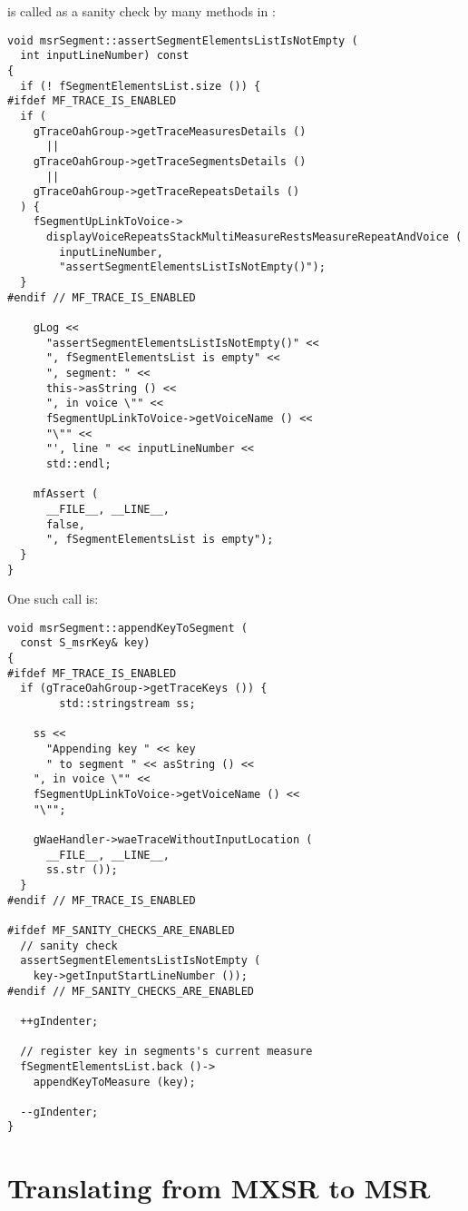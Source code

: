  is called as a sanity check by many methods in :
\begin{lstlisting}[language=CPlusPlus]
void msrSegment::assertSegmentElementsListIsNotEmpty (
  int inputLineNumber) const
{
  if (! fSegmentElementsList.size ()) {
#ifdef MF_TRACE_IS_ENABLED
  if (
    gTraceOahGroup->getTraceMeasuresDetails ()
      ||
    gTraceOahGroup->getTraceSegmentsDetails ()
      ||
    gTraceOahGroup->getTraceRepeatsDetails ()
  ) {
    fSegmentUpLinkToVoice->
      displayVoiceRepeatsStackMultiMeasureRestsMeasureRepeatAndVoice (
        inputLineNumber,
        "assertSegmentElementsListIsNotEmpty()");
  }
#endif // MF_TRACE_IS_ENABLED

    gLog <<
      "assertSegmentElementsListIsNotEmpty()" <<
      ", fSegmentElementsList is empty" <<
      ", segment: " <<
      this->asString () <<
      ", in voice \"" <<
      fSegmentUpLinkToVoice->getVoiceName () <<
      "\"" <<
      "', line " << inputLineNumber <<
      std::endl;

    mfAssert (
      __FILE__, __LINE__,
      false,
      ", fSegmentElementsList is empty");
  }
}
\end{lstlisting}

One such call is:
\begin{lstlisting}[language=CPlusPlus]
void msrSegment::appendKeyToSegment (
  const S_msrKey& key)
{
#ifdef MF_TRACE_IS_ENABLED
  if (gTraceOahGroup->getTraceKeys ()) {
		std::stringstream ss;

    ss <<
      "Appending key " << key
      " to segment " << asString () <<
    ", in voice \"" <<
    fSegmentUpLinkToVoice->getVoiceName () <<
    "\"";

    gWaeHandler->waeTraceWithoutInputLocation (
      __FILE__, __LINE__,
      ss.str ());
  }
#endif // MF_TRACE_IS_ENABLED

#ifdef MF_SANITY_CHECKS_ARE_ENABLED
  // sanity check
  assertSegmentElementsListIsNotEmpty (
    key->getInputStartLineNumber ());
#endif // MF_SANITY_CHECKS_ARE_ENABLED

  ++gIndenter;

  // register key in segments's current measure
  fSegmentElementsList.back ()->
    appendKeyToMeasure (key);

  --gIndenter;
}
\end{lstlisting}


\section{Translating from MXSR to MSR}


